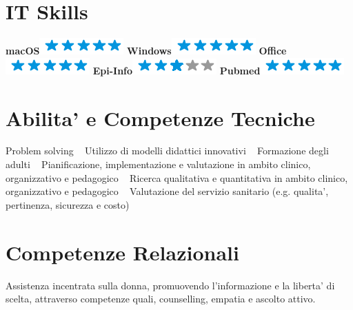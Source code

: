 \documentclass[11pt]{friggeri-cv}
\begin{document}
\begin{aside}
	\section{IT Skills}
	\textbf{macOS}\includegraphics[scale=0.40]{img/5stars.png}
	\textbf{Windows}\includegraphics[scale=0.40]{img/5stars.png}
	\textbf{Office}\includegraphics[scale=0.40]{img/5stars.png}
	\textbf{Epi-Info}\includegraphics[scale=0.40]{img/3stars.png}
	\textbf{Pubmed}\includegraphics[scale=0.40]{img/5stars.png}
  \section{Abilita' e Competenze Tecniche}
  \small Problem solving 
    ~
    Utilizzo di modelli didattici innovativi
    ~
    Formazione degli adulti
    ~
    Pianificazione, implementazione e valutazione in ambito clinico, organizzativo e 
    pedagogico 
    ~
    Ricerca qualitativa e quantitativa in ambito clinico, organizzativo e pedagogico 
    ~
    Valutazione del servizio sanitario (e.g. qualita', pertinenza, sicurezza e costo)
	\section{Competenze Relazionali}
  \small Assistenza incentrata sulla donna, promuovendo l'informazione e la liberta' 
  di scelta, attraverso competenze quali, counselling, empatia e ascolto attivo.
\end{aside}
\end{document}
